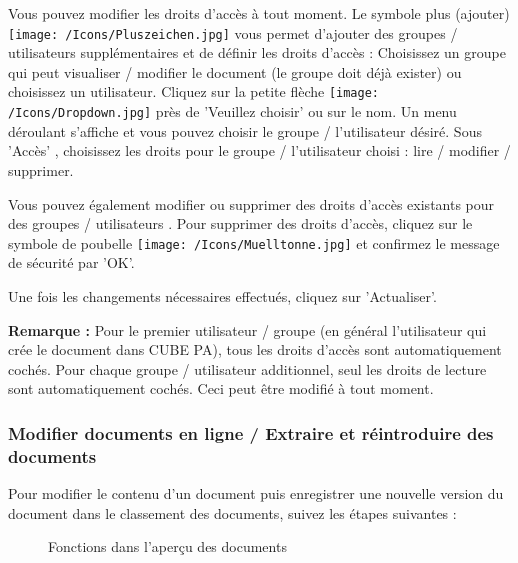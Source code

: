 Vous pouvez modifier les droits d'accès à tout moment. Le symbole plus (ajouter) \texttt{[image: /Icons/Pluszeichen.jpg]}  vous permet d'ajouter des groupes / utilisateurs supplémentaires et de définir les droits d'accès : Choisissez un groupe qui peut visualiser / modifier le document (le groupe doit déjà exister) ou choisissez un utilisateur. Cliquez sur la petite flèche \texttt{[image: /Icons/Dropdown.jpg]} près de 'Veuillez choisir' ou sur le nom. Un menu déroulant s'affiche et vous pouvez choisir le groupe / l'utilisateur désiré. Sous 'Accès' , choisissez les droits pour le groupe / l'utilisateur choisi : lire / modifier / supprimer.

\vspace{\baselineskip}

Vous pouvez également modifier ou supprimer des droits d'accès existants pour des groupes / utilisateurs . Pour supprimer des droits d'accès, cliquez sur le symbole de poubelle \texttt{[image: /Icons/Muelltonne.jpg]}  et confirmez le message de sécurité par 'OK'.  \newline

Une fois les changements nécessaires effectués, cliquez sur 'Actualiser'. 

\vspace{\baselineskip}

\textbf{Remarque :} Pour le premier utilisateur / groupe (en général l'utilisateur qui crée le document dans CUBE PA), tous les droits d'accès sont automatiquement cochés. Pour chaque groupe / utilisateur additionnel, seul les droits de lecture sont automatiquement cochés. Ceci peut être modifié à tout moment.


\subsubsection{Modifier documents en ligne / Extraire et réintroduire des documents}
\label{bkm:Ref442780171}\label{bkm:Ref442776572}

Pour modifier le contenu d'un document puis enregistrer une nouvelle version du document dans le classement des documents, suivez les étapes suivantes :

\begin{figure}[H]
\caption{Fonctions dans l'aperçu des documents}
\end{figure}

